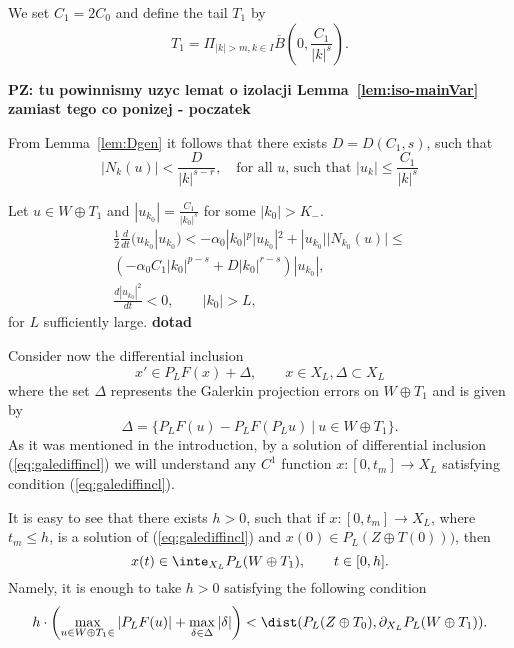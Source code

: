 We set $C_1=2C_0$ and define the tail $T_1$  by
\begin{equation*}
   T_1=\Pi_{|k|>m, k \in I} \overline{B}\left(0,\frac{C_1}{|k|^s}\right).
\end{equation*}

\textbf{PZ:  tu powinnismy uzyc lemat o izolacji Lemma~\ref{lem:iso-mainVar}  zamiast tego co ponizej - poczatek}


From Lemma~\ref{lem:Dgen} it follows that there exists
$D=D(C_1,s)$, such that
\begin{equation*}
  |N_k(u)| < \frac{D}{|k|^{s - r}}, \quad \mbox{for all $u$, such that $|u_k| \leq \frac{C_1}{|k|^s}$}
\end{equation*}

Let $u \in W \oplus T_1$ and $|u_{k_0}|=\frac{C_1}{|k_0|^{s}}$ for
some $|k_0| > K_-$.
\begin{eqnarray}
  \frac{1}{2}\frac{d}{dt}(u_{k_0}|u_{k_0}) < -\alpha_0 |k_0|^p |u_{k_0}|^2 + |u_{k_0}| |N_{k_0}(u)| \leq  \nonumber\\
   \left(- \alpha_0 C_1 |k_0|^{p-s} + D |k_0|^{r -s}\right) |u_{k_0}|, \nonumber \\
  \frac{d|u_{k_0}|^2}{dt}< 0, \qquad |k_0|> L,  \label{eq:farentry}
\end{eqnarray}
for $L$ sufficiently large.
\textbf{dotad}

Consider now the differential inclusion
\begin{equation}
  x' \in P_LF(x) + \Delta, \qquad x \in X_L, \Delta \subset X_L  \label{eq:galediffincl}
\end{equation}
where the set $\Delta$ represents the Galerkin projection errors
on $W \oplus T_1$ and is given by
\begin{equation*}
  \Delta=\{ P_LF(u) - P_L F(P_Lu) \: | \: u \in W \oplus T_1  \}.
\end{equation*}
As it was mentioned in the introduction, by a solution of
differential inclusion (\ref{eq:galediffincl}) we will understand
any $C^1$ function $x:[0,t_m] \to X_L$ satisfying condition
(\ref{eq:galediffincl}).



It is easy to see that there exists $h >0$, such that if
$x:[0,t_m]\to X_L$, where $t_m \leq h$, is a  solution of
(\ref{eq:galediffincl}) and $x(0) \in P_L(Z \oplus T(0)))$, then
\begin{equation}
x(t)  \in \inte_{X_L} P_L (W \oplus T_1), \qquad t \in [0,h].
\label{eq:dinclencl}
\end{equation}
Namely, it is enough to take $h>0$ satisfying the following
condition
\begin{equation*}
   h \cdot \left(\max_{u \in W \oplus T_1 \in } |P_LF(u)| + \max_{\delta \in \Delta}
   |\delta|\right) < \dist(P_L(Z \oplus T_0),\partial_{X_L} P_L(W\oplus
   T_1)).
\end{equation*}

